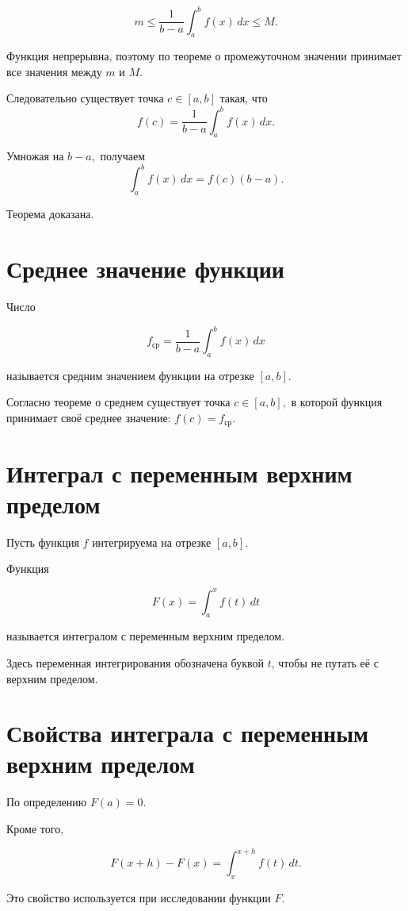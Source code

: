 \documentclass[14pt]{extreport}
\begin{document}
\[
m
\le
\frac{1}{b-a}
\int_a^b f(x)\,dx
\le
M.
\]

Функция непрерывна, поэтому по теореме о промежуточном значении
принимает все значения между $m$ и $M$.

Следовательно существует точка
$
c\in[a,b]
$
такая, что
\[
f(c)
=
\frac{1}{b-a}
\int_a^b f(x)\,dx.
\]

Умножая на
$
b-a,
$
получаем
\[
\int_a^b f(x)\,dx
=
f(c)(b-a).
\]

Теорема доказана.

\section{Среднее значение функции}

\begin{definition}
Число

$$
\boxed{
f_{\text{ср}}
=
\frac{1}{b-a}
\int_a^b f(x)\,dx
}
$$

называется средним значением функции на отрезке $[a,b]$.
\end{definition}

Согласно теореме о среднем существует точка
$
c\in[a,b],
$
в которой функция принимает своё среднее значение:
$
f(c)=f_{\text{ср}}.
$
\newpage
\section{Интеграл с переменным верхним пределом}

Пусть функция $f$ интегрируема на отрезке $[a,b]$.

\begin{definition}
Функция

\[
F(x)
=
\int_a^x f(t)\,dt
\]

называется интегралом с переменным верхним пределом.
\end{definition}

Здесь переменная интегрирования обозначена буквой $t$,
чтобы не путать её с верхним пределом.

\section{Свойства интеграла с переменным верхним пределом}

По определению
$
F(a)=0.
$

Кроме того,

\[
F(x+h)-F(x)
=
\int_x^{x+h}f(t)\,dt.
\]

Это свойство используется при исследовании функции $F$.
\end{document}
